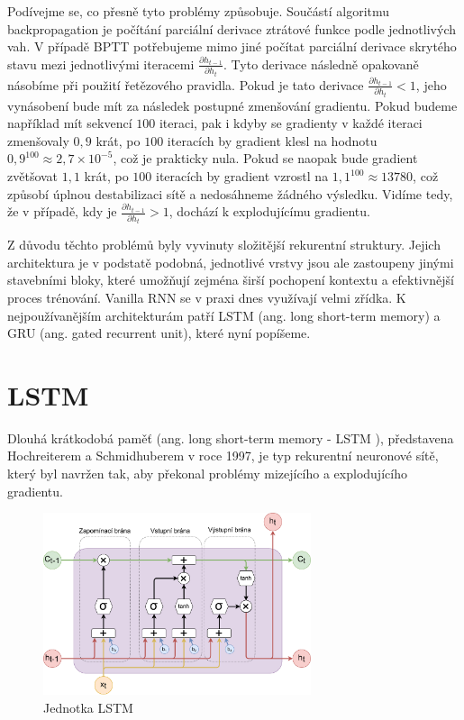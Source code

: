 Podívejme se, co přesně tyto problémy způsobuje. Součástí algoritmu
backpropagation je počítání parciální derivace ztrátové funkce podle
jednotlivých vah. V případě BPTT potřebujeme mimo jiné počítat parciální
derivace skrytého stavu mezi jednotlivými iteracemi $\frac{\partial
        h_{t-1}}{\partial h_t}$. Tyto derivace následně opakovaně násobíme při použití
řetězového pravidla. Pokud je tato derivace $\frac{\partial h_{t-1}}{\partial
        h_t}<1$, jeho vynásobení bude mít za následek postupné zmenšování gradientu.
Pokud budeme například mít sekvencí $100$ iteraci, pak i kdyby se gradienty v
každé iteraci zmenšovaly $0,9$ krát, po $100$ iteracích by gradient klesl na
hodnotu $0,9^{100} \approx 2,7 \times 10^{-5}$, což je prakticky nula. Pokud se
naopak bude gradient zvětšovat $1,1$ krát, po $100$ iteracích by gradient
vzrostl na $1,1^{100} \approx 13 780$, což způsobí úplnou destabilizaci sítě a
nedosáhneme žádného výsledku. Vidíme tedy, že v případě, kdy je $\frac{\partial
        h_{t-1}}{\partial h_t}>1$, dochází k explodujícímu gradientu.

Z důvodu těchto problémů byly vyvinuty složitější rekurentní struktury. Jejich
architektura je v podstatě podobná, jednotlivé vrstvy jsou ale zastoupeny
jinými stavebními bloky, které umožňují zejména širší pochopení kontextu a
efektivnější proces trénování. Vanilla RNN se v praxi dnes využívají velmi
zřídka. K nejpoužívanějším architekturám patří LSTM (ang. long short-term
memory) a GRU (ang. gated recurrent unit), které nyní popíšeme.

\section{LSTM}

Dlouhá krátkodobá paměť (ang. long short-term memory - LSTM ), představena
Hochreiterem a Schmidhuberem v roce 1997, je typ rekurentní neuronové sítě,
který byl navržen tak, aby překonal problémy mizejícího a explodujícího
gradientu.

\begin{figure}[]
    \centering
    \includegraphics[width=0.7\textwidth]{Figures/LSTM_unit.pdf}
    \caption{Jednotka LSTM}
    \label{fig:lstm}
\end{figure}

